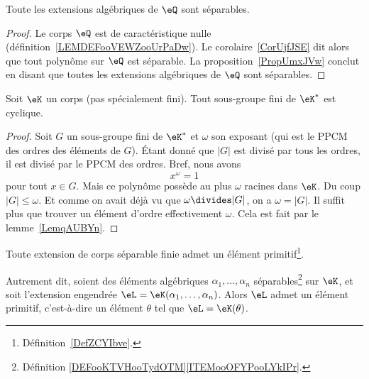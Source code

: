 \begin{corollary}  \label{CORooNZZMooIoBYXY}
	Toute les extensions algébriques de \( \eQ\) sont séparables.
\end{corollary}

\begin{proof}
	Le corps \( \eQ\) est de caractéristique nulle (définition~\ref{LEMDEFooVEWZooUrPaDw}). Le corolaire~\ref{CorUjfJSE} dit alors que tout polynôme sur \( \eQ\) est séparable. La proposition~\ref{PropUmxJVw} conclut en disant que toutes les extensions algébriques de \( \eQ\) sont séparables.
\end{proof}

\begin{theorem}      \label{ThobkwCMm}
	Soit \( \eK\) un corps (pas spécialement fini). Tout sous-groupe fini de \( \eK^*\) est cyclique.
\end{theorem}

\begin{proof}
	Soit \( G\) un sous-groupe fini de \( \eK^*\) et \( \omega\) son exposant (qui est le PPCM des ordres des éléments de \( G\)). Étant donné que \( | G |\) est divisé par tous les ordres, il est divisé par le PPCM des ordres. Bref, nous avons
	\begin{equation}
		x^{\omega}=1
	\end{equation}
	pour tout \( x\in G\). Mais ce polynôme possède au plus \( \omega\) racines dans \( \eK\). Du coup \( | G |\leq \omega\). Et comme on avait déjà vu que \( \omega\divides | G |\), on a \( \omega=| G |\). Il suffit plus que trouver un élément d'ordre effectivement \( \omega\). Cela est fait par le lemme~\ref{LemqAUBYn}.
\end{proof}

\begin{theorem}   \label{ThoORxgBC}
	Toute extension de corps séparable finie admet un élément primitif\footnote{Définition~\ref{DefZCYIbve}.}.

	Autrement dit, soient des éléments algébriques \( \alpha_1,\ldots, \alpha_n\) séparables\footnote{Définition \ref{DEFooKTVHooTydOTM}\ref{ITEMooOFYPooLYkIPr}.} sur \( \eK\), et soit l'extension engendrée \( \eL=\eK(\alpha_1,\ldots, \alpha_n)\). Alors \( \eL \) admet un élément primitif, c'est-à-dire un élément \( \theta \) tel que \( \eL = \eK(\theta)\).
\end{theorem}

